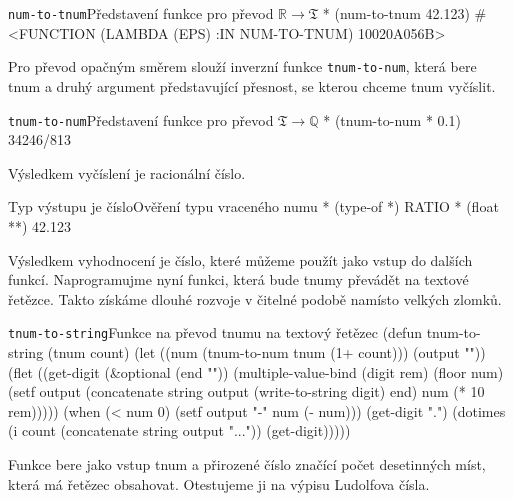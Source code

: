\begin{lisptest}{\texttt{num-to-tnum}}{Představení funkce pro převod $\mathbb{R}\to\mathfrak{T}$}
* (num-to-tnum 42.123)
#<FUNCTION (LAMBDA (EPS) :IN NUM-TO-TNUM) {10020A056B}>
\end{lisptest}

Pro převod opačným směrem slouží inverzní funkce \texttt{tnum-to-num}, která bere tnum a druhý argument představující přesnost, se kterou chceme tnum vyčíslit.

\begin{lisptest}{\texttt{tnum-to-num}}{Představení funkce pro převod $\mathfrak{T}\to\mathbb{Q}$}
* (tnum-to-num * 0.1)
34246/813
\end{lisptest}

Výsledkem vyčíslení je racionální číslo.

\begin{lisptest}{Typ výstupu je číslo}{Ověření typu vraceného numu}
* (type-of *)
RATIO
* (float **)
42.123
\end{lisptest}

Výsledkem vyhodnocení je číslo, které můžeme použít jako vstup do dalších funkcí. Naprogramujme nyní funkci, která bude tnumy převádět na textové řetězce. Takto získáme dlouhé rozvoje v čitelné podobě namísto velkých zlomků.

\begin{lispcode}{\texttt{tnum-to-string}}{Funkce na převod tnumu na textový řetězec}
(\textcolor{funkcionalni}{defun} \textcolor{pojmenovan}{tnum-to-string} (tnum count)
  (\textcolor{vedlejsi}{let} ((num (\textcolor{moje}{tnum-to-num} tnum (\textcolor{matematicke}{1+} count))) (output ""))
    (\textcolor{vedlejsi}{flet} ((get-digit (&optional (end ""))
             (\textcolor{matematicke}{multiple-value-bind} (digit rem) (\textcolor{matematicke}{floor} num)
               (\textcolor{vedlejsi}{setf} output (\textcolor{matematicke}{concatenate} \textquotesingle\textcolor{moje}{string} output 
                                         (\textcolor{funkcionalni}{write-to-string} digit)
                                         end)
                     num (\textcolor{matematicke}{*} 10 rem)))))
      (\textcolor{funkcionalni}{when} (\textcolor{matematicke}{<} num 0) (\textcolor{vedlejsi}{setf} output "-" num (\textcolor{matematicke}{-} num)))
      (\textcolor{moje}{get-digit} ".")  
      (\textcolor{funkcionalni}{dotimes} (i count (\textcolor{matematicke}{concatenate} \textquotesingle\textcolor{moje}{string} output "..."))
        (\textcolor{moje}{get-digit})))))
\end{lispcode}
Funkce bere jako vstup tnum a přirozené číslo značící počet desetinných míst, která má řetězec obsahovat. Otestujeme ji na výpisu Ludolfova čísla.

